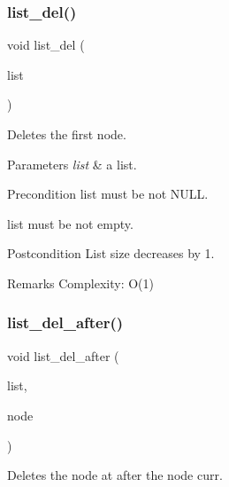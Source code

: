 \subsubsection{list\+\_\+del()}
{\footnotesize\ttfamily void list\+\_\+del (\begin{DoxyParamCaption}\item[{struct \textbf{ list} $\ast$}]{list }\end{DoxyParamCaption})\hspace{0.3cm}{\ttfamily [inline]}}

Deletes the first node.


\begin{DoxyParams}{Parameters}
{\em list} & a list.\\
\hline
\end{DoxyParams}
\begin{DoxyPrecond}{Precondition}
{\ttfamily list} must be not N\+U\+LL. 

{\ttfamily list} must be not empty.
\end{DoxyPrecond}
\begin{DoxyPostcond}{Postcondition}
List size decreases by 1.
\end{DoxyPostcond}
\begin{DoxyRemark}{Remarks}
Complexity\+: O(1) 
\end{DoxyRemark}
\mbox{\label{list_8c_ad301311c004c0b56091e2e89e5a1f5e8}} 
\subsubsection{list\+\_\+del\+\_\+after()}
{\footnotesize\ttfamily void list\+\_\+del\+\_\+after (\begin{DoxyParamCaption}\item[{struct \textbf{ list} $\ast$}]{list,  }\item[{struct \textbf{ list\+\_\+node} $\ast$}]{node }\end{DoxyParamCaption})\hspace{0.3cm}{\ttfamily [inline]}}

Deletes the node at after the node {\ttfamily curr}.


